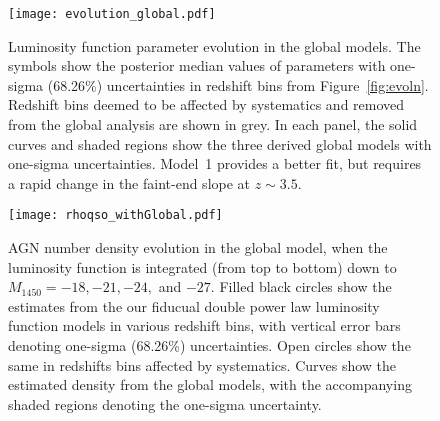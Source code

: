 \documentclass[fleqn,usenatbib]{mnras}
\begin{document}
\begin{figure*}
  \begin{center}
    \texttt{[image: evolution\_global.pdf]}
  \end{center}
  \caption{Luminosity function parameter evolution in the global
    models.  The symbols show the posterior median values of
    parameters with one-sigma (68.26\%) uncertainties in redshift bins
    from Figure~\ref{fig:evoln}.  Redshift bins deemed to be affected
    by systematics and removed from the global analysis are shown in
    grey.  In each panel, the solid curves and shaded regions show the
    three derived global models with one-sigma uncertainties.  Model~1
    provides a better fit, but requires a rapid change in the
    faint-end slope at $z\sim 3.5$.}
  \label{fig:evoln_global}
\end{figure*}

\begin{figure}
  \begin{center}
    \texttt{[image: rhoqso\_withGlobal.pdf]}
  \end{center}
  \caption{AGN number density evolution in the global model, when the
    luminosity function is integrated (from top to bottom) down to
    $M_\mathrm{1450}=-18, -21, -24,$ and $-27$.  Filled black circles
    show the estimates from the our fiducual double power law
    luminosity function models in various redshift bins, with vertical
    error bars denoting one-sigma (68.26\%) uncertainties.  Open
    circles show the same in redshifts bins affected by systematics.
    Curves show the estimated density from the global models, with the
    accompanying shaded regions denoting the one-sigma uncertainty. }
  \label{fig:rhoqso}
\end{figure}
\end{document}
